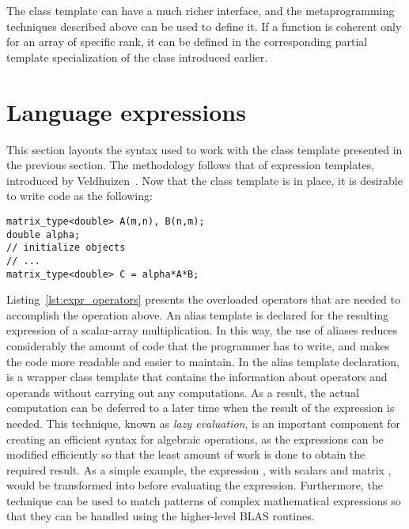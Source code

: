 \documentclass[11pt]{article}
\newcommand{\code}[1]{{\footnotesize\ttfamily{#1}}}
\begin{document}
The \code{Array} class template can have a much richer interface, and the metaprogramming techniques described above can be used to define it. If a function is coherent only for an array of specific rank, it can be defined in the corresponding partial template specialization of the \code{Array\_traits} class introduced earlier.

\section{Language expressions} \label{sec:expr}

This section layouts the syntax used to work with the \code{Array} class template presented in the previous section. The methodology follows that of expression templates, introduced by Veldhuizen~\cite{Veldhuizen:1995}.
Now that the \code{Array} class template is in place, it is desirable to write code as the following:
\begin{lstlisting}[frame=none]
matrix_type<double> A(m,n), B(n,m);
double alpha;
// initialize objects
// ...
matrix_type<double> C = alpha*A*B;
\end{lstlisting}
Listing~\ref{lst:expr_operators} presents the overloaded operators that are needed to accomplish the operation above.
An alias template is declared for the resulting expression of a scalar-array multiplication. In this way, the use of aliases reduces considerably the amount of code that the programmer has to write, and makes the code more readable and easier to maintain.
In the \code{SAm<d,T>} alias template declaration, \code{Expr} is a wrapper class template that contains the information about operators and operands without carrying out any computations.
As a result, the actual computation can be deferred to a later time when the result of the expression is needed. This technique, known as \emph{lazy evaluation}, is an important component for creating an efficient syntax for algebraic operations, as the expressions can be modified efficiently so that the least amount of work is done to obtain the required result.
As a simple example, the expression , with scalars  and matrix , would be transformed into  before evaluating the expression. Furthermore, the technique can be used to match patterns of complex mathematical expressions so that they can be handled using the higher-level BLAS routines.
\end{document}
